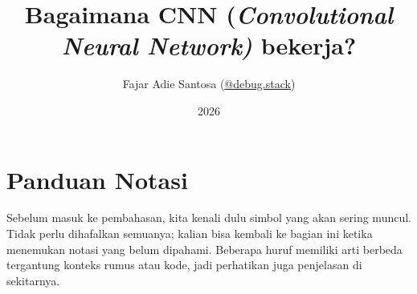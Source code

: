 \documentclass[12pt, letterpaper]{article}
\title{Bagaimana CNN (\textit{Convolutional Neural Network)} bekerja?}
\author{Fajar Adie Santosa (\href{https://www.instagram.com/debug_stack/}{@debug.stack})}
\date{2026}
\begin{document}
\maketitle

\newpage
\tableofcontents
\newpage


\section*{Panduan Notasi}
Sebelum masuk ke pembahasan, kita kenali dulu simbol yang akan sering muncul. Tidak perlu dihafalkan semuanya; kalian bisa kembali ke bagian ini ketika menemukan notasi yang belum dipahami. Beberapa huruf memiliki arti berbeda tergantung konteks rumus atau kode, jadi perhatikan juga penjelasan di sekitarnya.
\end{document}
